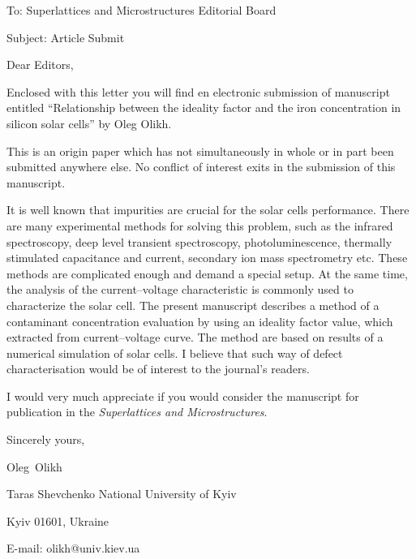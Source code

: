 \documentclass[preprint]{elsarticle}
\begin{document}
To:
Superlattices and Microstructures Editorial Board


Subject:
Article Submit

\vspace{5mm}
Dear Editors,

\vspace{3mm}
Enclosed with this letter you will find en electronic submission of manuscript entitled
``Relationship between the ideality factor and the iron concentration in silicon solar cells'' by Oleg Olikh.

This is an origin paper which has not simultaneously in whole or in part been submitted anywhere else.
No conflict of interest exits in the submission of this manuscript.

It is well known that impurities are crucial for the solar cells performance.
There are many experimental methods for solving this problem, such as the infrared spectroscopy, deep level transient spectroscopy, photoluminescence,
thermally stimulated capacitance and current, secondary ion mass spectrometry etc.
These methods are complicated  enough and demand a special setup.
At the same time, the analysis of  the current--voltage  characteristic is commonly used  to characterize the solar cell.
The present manuscript describes a method of a contaminant concentration evaluation by using an ideality factor value, which extracted from current--voltage curve.
The method are based on results of a numerical simulation of solar cells.
I believe that such way of defect characterisation would be of interest to the journal’s readers.



I would  very much appreciate if you would consider the manuscript for publication in the \emph{Superlattices and Microstructures}.

\vspace{3mm}

Sincerely yours,

Oleg~Olikh


Taras Shevchenko National University of Kyiv


Kyiv 01601, Ukraine

E-mail: olikh@univ.kiev.ua


\end{document}
